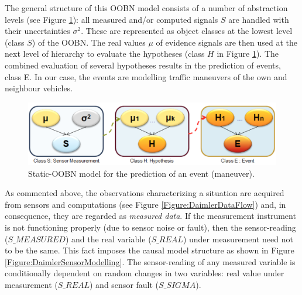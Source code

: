 

The general structure of this OOBN model consists of a number of abstraction levels (see Figure \ref{Figure:DaimlerOOBNAbstraction}): all measured and/or computed signals $S$ are handled with their uncertainties $\sigma^2$. These are represented as object classes at the lowest level (class $S$) of the OOBN. The real values $\mu$ of evidence signals are then used at the next level of hierarchy to evaluate the hypotheses (class $H$ in Figure \ref{Figure:DaimlerOOBNAbstraction}). The combined evaluation of several hypotheses results in the prediction of events, class E. In our case, the events are modelling traffic maneuvers of the own and neighbour vehicles.

\begin{figure}
\begin{center}
\includegraphics[scale=0.35]{./figures/DaimlerOOBNAbstraction}
\caption{\label{Figure:DaimlerOOBNAbstraction} Static-OOBN model for the prediction of an event (maneuver).}
\end{center}
\end{figure}

As commented above, the observations characterizing a situation are acquired from sensors and computations (see Figure \ref{Figure:DaimlerDataFlow}) and, in consequence, they are regarded as  \textit{measured data}. If the measurement instrument is not functioning properly (due to sensor noise or fault), then the sensor-reading ($S\_MEASURED$) and the real variable ($S\_REAL$) under measurement need not to be the same. This fact imposes the causal model structure as shown in Figure \ref{Figure:DaimlerSensorModelling}. The sensor-reading of any measured variable is conditionally dependent on random changes in two variables: real value under measurement ($S\_REAL$) and sensor fault ($S\_SIGMA$).

